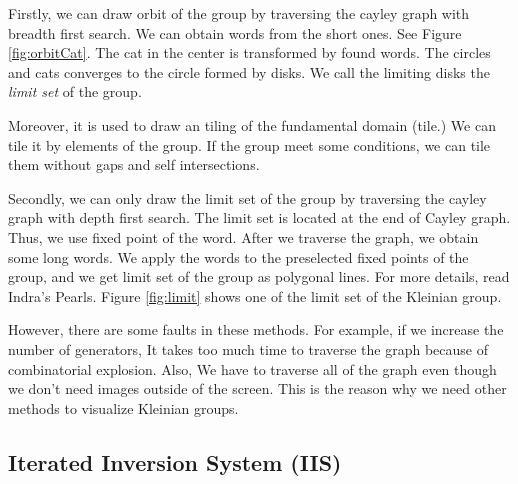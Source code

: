 Firstly, we can draw orbit of the group by traversing the cayley graph with
breadth first search. We can obtain words from the short ones.
See Figure \ref{fig:orbitCat}.
The cat in the center is transformed by found words.
The circles and cats converges to the circle formed by disks.
We call the limiting disks the \textit{limit set} of the group.


Moreover, it is used to draw an tiling of the fundamental domain (tile.)
We can tile it by elements of the group.
If the group meet some conditions, we can tile them without gaps and
self intersections.

Secondly, we can only draw the limit set of the group by traversing the
cayley graph with depth first search.
The limit set is located at the end of Cayley graph. Thus, we use fixed
point of the word. 
After we traverse the graph, we obtain some long words.
We apply the words to the preselected fixed points of the group, and
we get limit set of the group as polygonal lines.
For more details, read Indra's Pearls.
Figure \ref{fig:limit} shows one of the limit set of the Kleinian group.

However, there are some faults in these methods.
For example, if we increase the number of generators,
It takes too much time to traverse the graph because of
combinatorial explosion.
Also, We have to traverse all of the graph
even though we don't need images outside of the screen.
This is the reason why we need other methods to visualize Kleinian
groups.

\subsection{Iterated Inversion System (IIS)}

